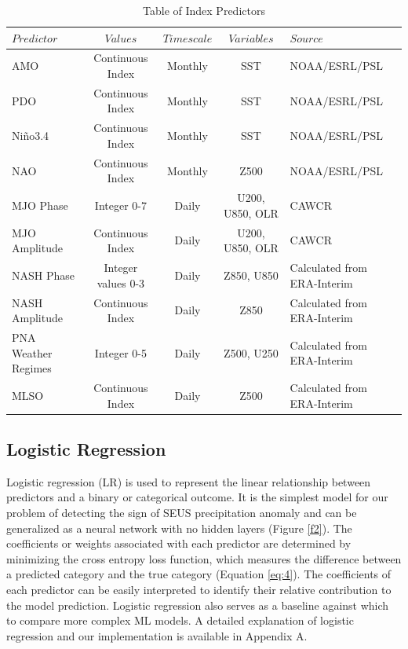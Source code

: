 \documentclass{ametsocV6.1}
\begin{document}
\begin{table}[t]
\caption{Table of Index Predictors}\label{t1}
\begin{center}
\begin{tabular}{lcccl}
\hline\hline
$Predictor$ & $Values$ & $Timescale$ & $Variables$ & $Source$\\
\hline
AMO & Continuous Index & Monthly & SST & NOAA/ESRL/PSL \\
PDO & Continuous Index & Monthly & SST & NOAA/ESRL/PSL \\
Ni\~{n}o3.4 & Continuous Index & Monthly & SST & NOAA/ESRL/PSL \\
NAO & Continuous Index & Monthly & Z500 & NOAA/ESRL/PSL \\
MJO Phase & Integer 0-7 & Daily & U200, U850, OLR & CAWCR \\
MJO Amplitude & Continuous Index & Daily & U200, U850, OLR & CAWCR \\
NASH Phase & Integer values 0-3 & Daily & Z850, U850 & Calculated from ERA-Interim \\
NASH Amplitude & Continuous Index & Daily & Z850 & Calculated from ERA-Interim \\
PNA Weather Regimes & Integer 0-5 & Daily & Z500, U250 & Calculated from ERA-Interim \\
MLSO & Continuous Index & Daily & Z500 & Calculated from ERA-Interim \\
\hline
\end{tabular}
\end{center}
\end{table}

\subsection{Logistic Regression}
\label{sec:lr}

Logistic regression (LR) is used to represent the linear relationship between predictors and a binary or categorical outcome. It is the simplest model for our problem of detecting the sign of SEUS precipitation anomaly and can be generalized as a neural network with no hidden layers (Figure \ref{f2}).  The coefficients or weights associated with each predictor are determined by minimizing the cross entropy loss function, which measures the difference between a predicted category and the true category (Equation \ref{eq:4}). The coefficients of each predictor can be easily interpreted to identify their relative contribution to the model prediction. Logistic regression also serves as a baseline against which to compare more complex ML models. A detailed explanation of logistic regression and our implementation is available in Appendix A.
\end{document}
